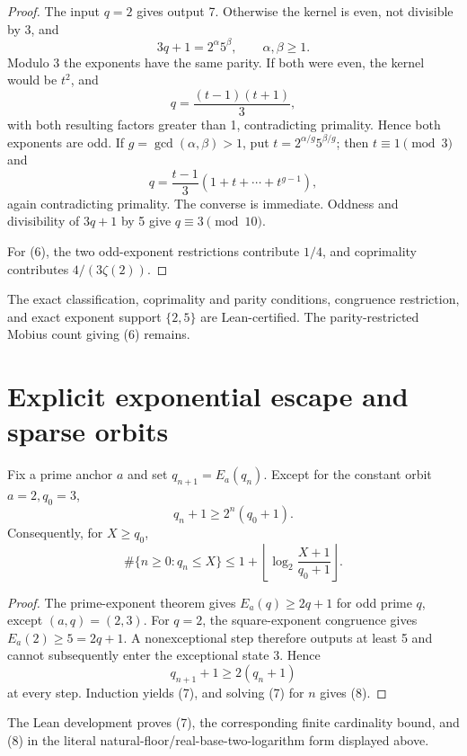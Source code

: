 \documentclass[10pt,a4paper]{scrartcl}
\begin{document}
\begin{proof}
The input $q=2$ gives output 7. Otherwise the kernel is even, not divisible by 3, and
\[
3q+1=2^\alpha5^\beta,\qquad \alpha,\beta\ge1.
\]
Modulo 3 the exponents have the same parity. If both were even, the kernel would be $t^2$, and
\[
q=\frac{(t-1)(t+1)}3,
\]
with both resulting factors greater than 1, contradicting primality. Hence both exponents are odd. If $g=\gcd(\alpha,\beta)>1$, put $t=2^{\alpha/g}5^{\beta/g}$; then $t\equiv1\pmod3$ and
\[
q=\frac{t-1}{3}(1+t+\cdots+t^{g-1}),
\]
again contradicting primality. The converse is immediate. Oddness and divisibility of $3q+1$ by 5 give $q\equiv3\pmod{10}$.

For (6), the two odd-exponent restrictions contribute $1/4$, and coprimality contributes $4/(3\zeta(2))$.
\end{proof}

The exact classification, coprimality and parity conditions, congruence restriction, and exact exponent support $\{2,5\}$ are Lean-certified. The parity-restricted Mobius count giving (6) remains.

\section{Explicit exponential escape and sparse orbits}

Fix a prime anchor $a$ and set $q_{n+1}=E_a(q_n)$. Except for the constant orbit $a=2,q_0=3$,
\begin{equation}
q_n+1\ge2^n(q_0+1). \tag{7}
\end{equation}
Consequently, for $X\ge q_0$,
\begin{equation}
\#\{n\ge0:q_n\le X\}
\le1+\left\lfloor\log_2\frac{X+1}{q_0+1}\right\rfloor. \tag{8}
\end{equation}

\begin{proof}
The prime-exponent theorem gives $E_a(q)\ge2q+1$ for odd prime $q$, except $(a,q)=(2,3)$. For $q=2$, the square-exponent congruence gives $E_a(2)\ge5=2q+1$. A nonexceptional step therefore outputs at least 5 and cannot subsequently enter the exceptional state 3. Hence
\[
q_{n+1}+1\ge2(q_n+1)
\]
at every step. Induction yields (7), and solving (7) for $n$ gives (8).
\end{proof}

The Lean development proves (7), the corresponding finite cardinality bound, and (8) in the literal natural-floor/real-base-two-logarithm form displayed above.
\end{document}
